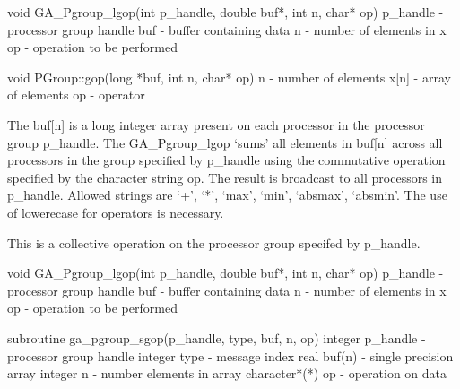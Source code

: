 \documentclass[12pt]{article}
\begin{document}

\begin{capi}
void GA_Pgroup_lgop(int p_handle, double buf*, int n, char* op)
   p_handle                      - processor group handle                  \access{[input]} 
   buf                           - buffer containing data            
   n                             - number of elements in x                 \access{[input]} 
   op                            - operation to be performed               \access{[input]} 
\end{capi}

\begin{cxxapi}
void PGroup::gop(long *buf, int n, char* op)
   n              - number of elements                                     \access{[input]}
   x[n]           - array of elements                               
   op             - operator                                               \access{[input]}
\end{cxxapi}

\begin{desc}

The buf[n] is a long integer array present on each processor in the processor group p_handle. The GA_Pgroup_lgop `sums' all elements in buf[n] across all processors in the group specified by p_handle using the commutative operation specified by the character string op.  The result is broadcast to all processors in p_handle. Allowed strings are `+', `*', `max', `min', `absmax', `absmin'. The use of lowerecase for operators is necessary.

This is a collective operation on the processor group specifed by p_handle. 
\end{desc}


\begin{capi}
void GA_Pgroup_lgop(int p_handle, double buf*, int n, char* op)
   p_handle                      - processor group handle                  \access{[input]} 
   buf                           - buffer containing data            
   n                             - number of elements in x                 \access{[input]} 
   op                            - operation to be performed               \access{[input]} 
\end{capi}

\begin{fapi}
subroutine ga_pgroup_sgop(p_handle, type, buf, n, op)
   integer p_handle              - processor group handle                  \access{[input]} 
   integer type                  - message index                           \access{[input]} 
   real buf(n)                   - single precision array            
   integer n                     - number elements in array                \access{[input]} 
   character*(*) op              - operation on data                       \access{[input]} 
\end{fapi}
\end{document}
